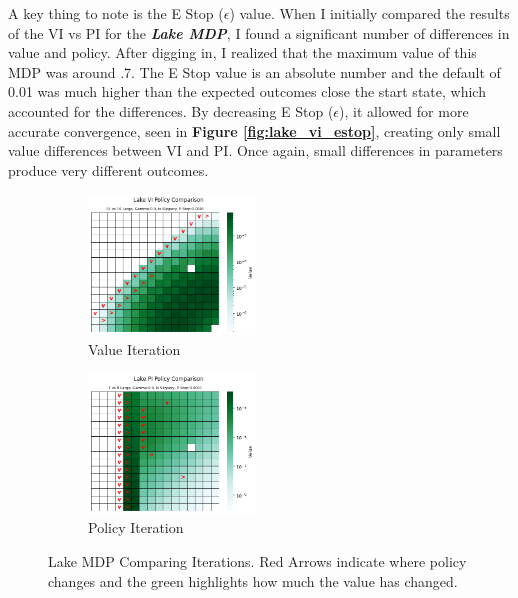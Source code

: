 \documentclass[letterpaper]{article} %
\begin{document}
A key thing to note is the E Stop ($\epsilon$) value.  When I initially compared the results of the VI vs PI for the \textbf{\emph{Lake MDP}}, I found a significant number of differences in value and policy.  After digging in, I realized that the maximum value of this MDP was around .7.  The E Stop value is an absolute number and the default of 0.01 was much higher than the expected outcomes close the start state, which accounted for the differences.  By decreasing E Stop ($\epsilon$), it allowed for more accurate convergence, seen in \textbf{Figure \ref{fig:lake_vi_estop}}, creating only small value differences between VI and PI.  Once again, small differences in parameters produce very different outcomes.  

\begin{figure}[!htb]
	\begin{subfigure}[b]{0.25\textwidth}
	\centering
		\includegraphics[width=1.75in]{Figures/Lake_VI_Policy_Comparison_15_vs_16_Large__Gamma_0_9__Is_Slippery__E_Stop_0_0001.png}
		\caption{Value Iteration}
  	\end{subfigure}%
	\begin{subfigure}[b]{0.25\textwidth}
	\centering
		\includegraphics[width=1.75in]{Figures/Lake_PI_Policy_Comparison_7_vs_8_Large__Gamma_0_9__Is_Slippery__E_Stop_0_0001.png}
		\caption{Policy Iteration}
  	\end{subfigure}%
\caption{Lake MDP Comparing Iterations.  Red Arrows indicate where policy changes and the green highlights how much the value has changed.}
\label{fig:lake_iteration_comparison}
\end{figure}
\end{document}
